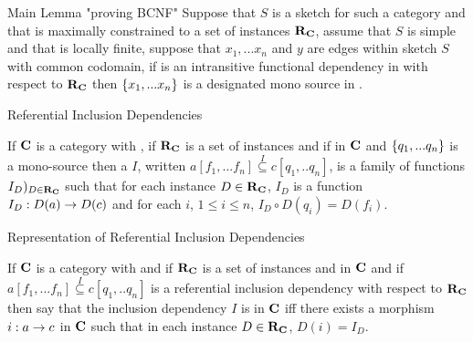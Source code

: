 \begin{frame}{Main Lemma "proving BCNF"}
Suppose that $S$ is a sketch for such a category \catcw and that \catcw 
is maximally constrained to a set of instances $\textbf{R}_{\textbf{C}}$, 
assume that $S$ is simple and that \catcw is locally finite,
suppose that $x_1,...x_n$ and $y$ are edges
 within sketch $S$ with common codomain, 
if  is an intransitive functional dependency in \catcw  with respect to $\textbf{R}_{\textbf{C}}$
 then $\left\{x_1,...x_n\right\}$ is a designated mono source in \catc.
\end{frame}

\begin{frame}{Referential Inclusion Dependencies}
\begin{definition}
If $\textbf{C}$ is a category with \thirdstructure, if $\textbf{R}_{\textbf{C}}$ is a set of instances 
and if \fnsourceqnsource in $\textbf{C}$ and  $\left\{q_1,...q_n\right\}$ is a mono-source
 then a  $I$, 
 written $a[f_1,...f_n] \overset{I}{\subseteq} c[q_1,..q_n]$, 
 is a family of functions $I_D)_{D \in \textbf{R}_{\textbf{C}}}$
such that for each instance $D \in \textbf{R}_{\textbf{C}}$, $I_D$ is a function $I_D : D(a) \rightarrow D(c)$ and
for each $i$, $1 \leq i \le n$, $I_D \circ D(q_i) = D(f_i)$.
\end{definition}
\end{frame}

\begin{frame}{Representation of Referential Inclusion Dependencies}
\begin{definition}
If $\textbf{C}$ is a category with \thirdstructure
and if $\textbf{R}_{\textbf{C}}$ is a set of instances
and \fnsourceqnsource in $\textbf{C}$ 
and if $a[f_1,...f_n] \overset{I}{\subseteq} c[q_1,..q_n]$ is a referential inclusion dependency
with respect  to $\textbf{R}_{\textbf{C}}$ 
then say that the inclusion dependency $I$ is  in $\textbf{C}$
iff there exists a morphism $i:a \rightarrow c$ in $\textbf{C}$ such that in each instance $D \in \textbf{R}_{\textbf{C}}$, $D(i) = I_D$. 
\end{definition}
\end{frame}
